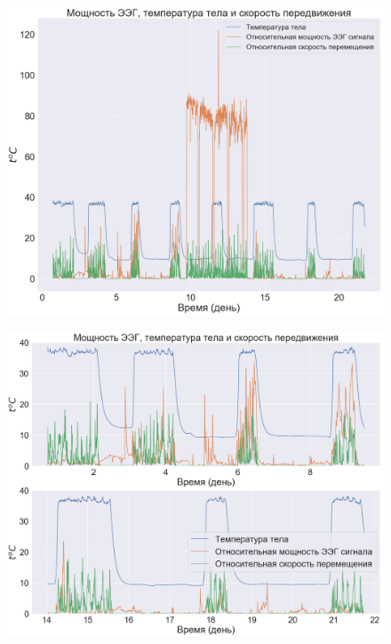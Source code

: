 \documentclass[12pt,a4paper,oneside]{article}
\begin{document}
\begin{figure}[H]
\centering
\begin{minipage}{.5\textwidth}
  \centering
  \includegraphics[width=\textwidth]{general.png}
  \label{fig:general}
\end{minipage}%
\begin{minipage}{.5\textwidth}
  \centering
  \includegraphics[width=\textwidth]{general2.png}
  \label{fig:general2}
\end{minipage}
\end{figure}
\end{document}
